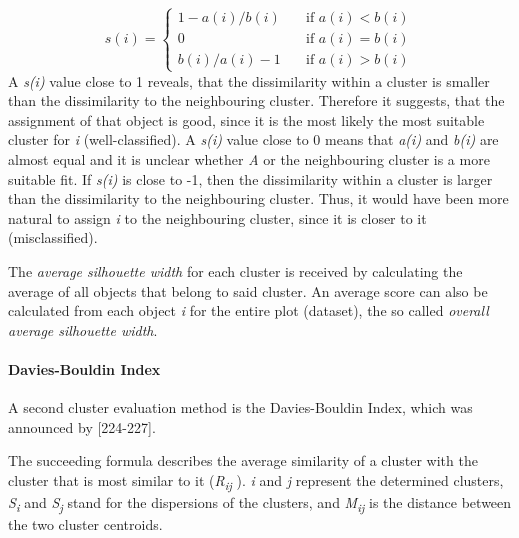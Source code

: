   \[ s(i) =
  \begin{cases}
    1 - a(i)/b(i)       & \quad \text{if } a(i) < b(i)\\
    0       & \quad \text{if } a(i) = b(i)\\
 b(i)/a(i) - 1      & \quad \text{if } a(i) > b(i)

  \end{cases}
\]
A \textit{s(i)} value close to 1 reveals, that the dissimilarity within a cluster is smaller than the dissimilarity to the neighbouring cluster. Therefore it suggests, that the assignment of that object is good, since it is the most likely the most suitable cluster for \textit{i} (well-classified). A \textit{s(i)} value close to 0 means that \textit{a(i)} and \textit{b(i)} are almost equal and it is unclear whether \textit{A} or the neighbouring cluster is a more suitable fit. If \textit{s(i)} is close to -1, then the dissimilarity within a cluster is larger than the dissimilarity to the neighbouring cluster. Thus, it would have been more natural to assign \textit{i} to the neighbouring cluster, since it is closer to it (misclassified).

The \textit{average silhouette width} for each cluster is received by calculating the average of all objects that belong to said cluster. An average score can also be calculated from each object \textit{i} for the entire plot (dataset), the so called \textit{overall average silhouette width}. 





\paragraph{Davies-Bouldin Index}
A second cluster evaluation method is the Davies-Bouldin Index, which was announced by \textcite{DaviesBouldin}[224-227]. 

The succeeding formula describes the average similarity of a cluster with the cluster that is most similar to it (\textit{R\textsubscript{ij}} ).
\textit{i} and \textit{j} represent the determined clusters, \textit{S\textsubscript{i}} and \textit{S\textsubscript{j}} stand for the dispersions of the clusters, and \textit{M\textsubscript{ij}} is the distance between the two cluster centroids. 

